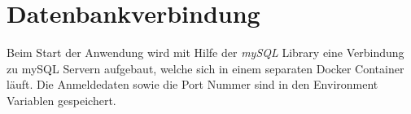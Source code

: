 \section{Datenbankverbindung}

Beim Start der Anwendung wird mit Hilfe der \textit{mySQL} Library eine Verbindung zu mySQL
Servern aufgebaut, welche sich in einem separaten Docker Container läuft. Die Anmeldedaten
sowie die Port Nummer sind in den Environment Variablen gespeichert.
